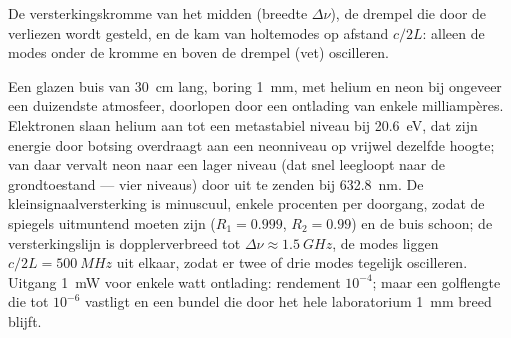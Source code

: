 \begin{omfigure}

{\small De versterkingskromme van het midden (breedte $\Delta\nu$), de drempel
die door de verliezen wordt gesteld, en de kam van holtemodes op afstand
$c/2L$: alleen de
modes onder de kromme en boven de drempel (vet) oscilleren.}
\end{omfigure}

\begin{example}\label{ex:b2:laser:hene}
Een glazen buis van \qty{30}{cm} lang, boring \qty{1}{mm}, met helium en
neon bij ongeveer een duizendste atmosfeer, doorlopen door een ontlading van
enkele milliampères. Elektronen slaan helium aan tot een metastabiel niveau bij
\qty{20.6}{eV}, dat zijn energie door botsing overdraagt aan een neonniveau op
vrijwel dezelfde hoogte; van daar vervalt neon naar een lager niveau
(dat snel leegloopt naar de grondtoestand --- vier niveaus) door uit te zenden bij
\qty{632.8}{nm}. De kleinsignaalversterking is minuscuul, enkele procenten per
doorgang, zodat de spiegels uitmuntend moeten zijn ($R_1 = 0.999$, $R_2 = 0.99$)
en de buis schoon; de versterkingslijn is dopplerverbreed tot
$\Delta\nu \approx \qty{1.5}{GHz}$, de modes liggen $c/2L = \qty{500}{MHz}$
uit elkaar, zodat er twee of drie modes tegelijk oscilleren. Uitgang
\qty{1}{mW} voor
enkele watt ontlading: rendement $10^{-4}$; maar een golflengte
die tot $10^{-6}$ vastligt en een bundel die door het hele
laboratorium \qty{1}{mm} breed blijft.
\end{example}

